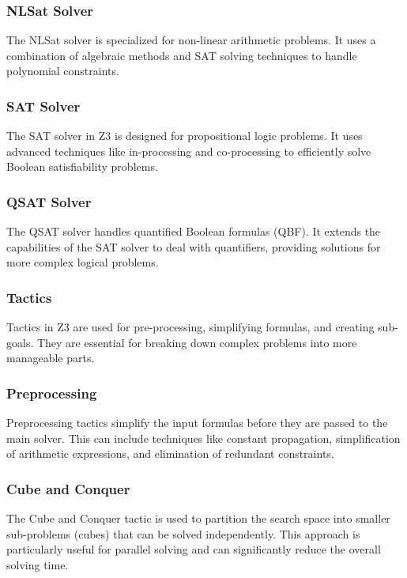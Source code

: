 \documentclass[]{rptuseminar}
\begin{document}
\subsubsection*{NLSat Solver}
The NLSat solver is specialized for non-linear arithmetic problems. 
It uses a combination of algebraic methods and SAT solving techniques to handle polynomial constraints.
\cite{nikolaj_bjorner_programming_nodate}

\subsubsection*{SAT Solver}
The SAT solver in Z3 is designed for propositional logic problems. It uses advanced techniques like in-processing 
and co-processing to efficiently solve Boolean satisfiability problems.
\cite{nikolaj_bjorner_programming_nodate}

\subsubsection*{QSAT Solver}
The QSAT solver handles quantified Boolean formulas (QBF). It extends the capabilities of the SAT solver to deal with quantifiers, 
providing solutions for more complex logical problems.
\cite{nikolaj_bjorner_programming_nodate}


\subsubsection{Tactics}
Tactics in Z3 are used for pre-processing, simplifying formulas, and creating sub-goals. 
They are essential for breaking down complex problems into more manageable parts.
\cite{nikolaj_bjorner_programming_nodate}

\subsubsection*{Preprocessing}
Preprocessing tactics simplify the input formulas before they are passed to the main solver. This can include techniques 
like constant propagation, simplification of arithmetic expressions, and elimination of redundant constraints.
\cite{nikolaj_bjorner_programming_nodate}

\subsubsection*{Cube and Conquer}
The Cube and Conquer tactic is used to partition the search space into smaller sub-problems (cubes) that can be solved independently. 
This approach is particularly useful for parallel solving and can significantly reduce the overall solving time.
\cite{nikolaj_bjorner_programming_nodate}
\end{document}
